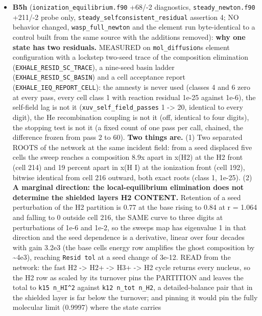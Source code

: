 \documentclass[english,a4paper]{my_memo}
\begin{document}
\begin{itemize}
\item
  \textbf{B5h} (\texttt{ionization\_equilibrium.f90} +68/-2 diagnostics,
  \texttt{steady\_newton.f90} +211/-2 probe only, \texttt{steady\_selfconsistent\_residual}
  assertion 4; NO behavior changed, \texttt{wasp\_full\_newton} and the element run
  byte-identical to a control built from the same source with the additions
  removed): \textbf{why one state has two residuals.} MEASURED on
  \texttt{mol\_diffusion}\textquotesingle s element configuration with a lockstep two-seed trace of
  the composition elimination (\texttt{EXHALE\_RESID\_SC\_TRACE}), a nine-seed basin
  ladder (\texttt{EXHALE\_RESID\_SC\_BASIN}) and a cell acceptance report
  (\texttt{EXHALE\_IEQ\_REPORT\_CELL}): the amnesty is never used (classes 4 and 6
  zero at every pass, every cell class 1 with reaction residual 1e-25
  against 1e-6), the self-field lag is not it (\texttt{xuv\_self\_field\_passes} 1 -\textgreater{}
  20, identical to every digit), the He recombination coupling is not it
  (off, identical to four digits), the stopping test is not it (a fixed
  count of one pass per call, chained, the difference frozen from pass 2
  to 60). \textbf{Two things are.} (1) Two separated ROOTS of the network at the
  same incident field: from a seed displaced five cells the sweep reaches a
  composition 8.9x apart in x(H2) at the H2 front (cell 214) and 19 percent
  apart in x(H I) at the ionization front (cell 192), bitwise identical from
  cell 216 outward, both exact roots (class 1, 1e-25). (2) \textbf{A marginal
  direction: the local-equilibrium elimination does not determine the
  shielded layer\textquotesingle s H2 CONTENT.} Retention of a seed perturbation of the H2
  partition is 0.77 at the base rising to 0.84 at r = 1.064 and falling to
  0 outside cell 216, the SAME curve to three digits at perturbations of
  1e-6 and 1e-2, so the sweep\textquotesingle s map has eigenvalue 1 in that direction and
  the seed dependence is a derivative, linear over four decades with gain
  3.2e3 (the base cell\textquotesingle s energy row amplifies the ghost composition by
  \textasciitilde4e3), reaching \texttt{Resid\ tol} at a seed change of 3e-12. READ from the
  network: the fast H2 -\textgreater{} H2+ -\textgreater{} H3+ -\textgreater{} H2 cycle returns every nucleus, so
  the H2 row as scaled by its turnover pins the PARTITION and leaves the
  total to \texttt{k15\ n\_HI\^{}2} against \texttt{k12\ n\_tot\ n\_H2}, a detailed-balance pair
  that in the shielded layer is far below the turnover; and pinning it
  would pin the fully molecular limit (0.9997) where the state carries

\end{itemize}
\end{document}
